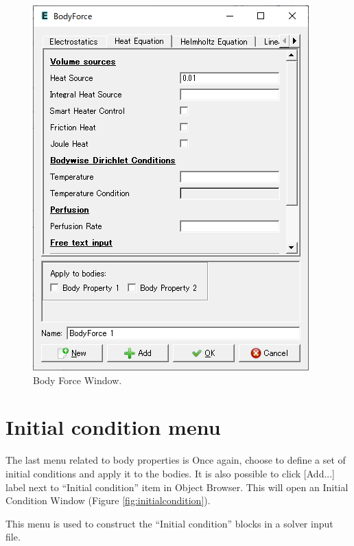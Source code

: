 \begin{figure}[htb]
\begin{center}
 \includegraphics[scale=0.5]{images/bodyforce.png}
\caption{Body Force Window.}
\label{fig:bodyforce}
\end{center}
\end{figure}

\section{Initial condition menu}

The last menu related to body properties is
\noindent 
Once again, choose
\noindent to define a set of initial conditions and apply it to the bodies. It is also possible to click [Add...] label next to ``Initial condition'' item in Object Browser. This will open an Initial Condition Window (Figure \ref{fig:initialcondition}).

This menu is used to construct the ``Initial condition'' blocks in a
solver input file.


